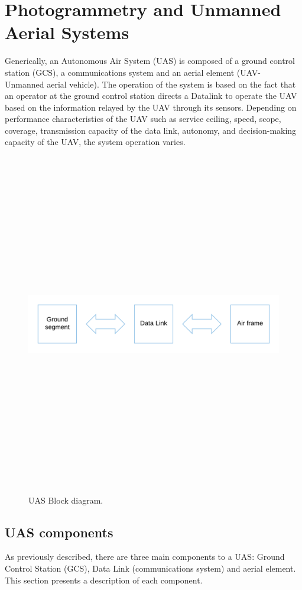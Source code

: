 \section{Photogrammetry and Unmanned Aerial Systems}
Generically, an Autonomous Air System (UAS) is composed of a ground control station (GCS), a communications system and an aerial element (UAV- Unmanned aerial vehicle). The operation of the system is based on the fact that an operator at the ground control station directs a Datalink to operate the UAV based on the information relayed by the UAV through its sensors. Depending on performance characteristics of the UAV such as service ceiling, speed, scope, coverage, transmission capacity of the data link, autonomy, and decision-making capacity of the UAV, the system operation varies.\cite{Duran}
\begin{figure}[H]
\centering
\includegraphics[width=15cm,height=15cm,keepaspectratio]{imagenes/UAS_Components.png}
\caption{UAS Block diagram.}
\label{fig:block diagram}
\end{figure}

\subsection{UAS components}
As previously described, there are three main components to a UAS: Ground Control Station (GCS), Data Link (communications system) and aerial element. This section presents a description of each component.
